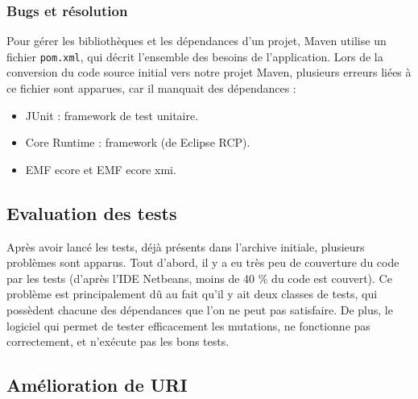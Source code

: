 \documentclass[a4paper]{article}
\begin{document}
		\vspace{0.5cm}

		\subsubsection{Bugs et résolution}

		\vspace{0.5cm}

		Pour gérer les bibliothèques et les dépendances d'un projet, Maven utilise un fichier \texttt{pom.xml}, qui décrit l'ensemble des besoins de l'application. Lors de la conversion du code source initial vers notre projet Maven, plusieurs erreurs liées à ce fichier sont apparues, car il manquait des dépendances :
		\begin{itemize}
			\item JUnit : framework de test unitaire.
			\item Core Runtime : framework (de Eclipse RCP).
			\item EMF ecore et EMF ecore xmi.
		\end{itemize}

		\vspace{0.5cm}



		\subsection{Evaluation des tests}

		\vspace{0.5cm}

		Après avoir lancé les tests, déjà présents dans l'archive initiale, plusieurs problèmes sont apparus. Tout d'abord, il y a eu très peu de couverture du code par les tests (d'après l'IDE Netbeans, moins de 40 \% du code est couvert). Ce problème est principalement dû au fait qu'il y ait deux classes de tests, qui possèdent chacune des dépendances que l'on ne peut pas satisfaire. De plus, le logiciel qui permet de tester efficacement les mutations, ne fonctionne pas correctement, et n'exécute pas les bons tests.

	\newpage

	\begin{center}
		\section{Amélioration de URI}
	\end{center}
\end{document}
